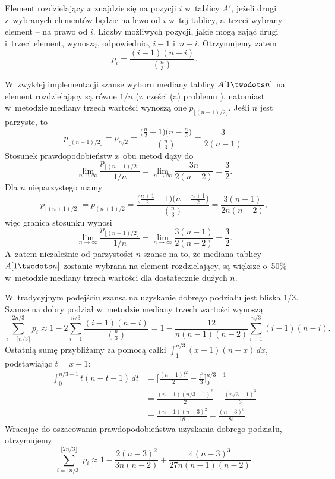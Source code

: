
\subproblem %
Element rozdzielający $x$ znajdzie się na pozycji $i$ w~tablicy $A'$, jeżeli drugi z~wybranych elementów będzie na lewo od $i$ w~tej tablicy, a~trzeci wybrany element -- na prawo od $i$.
Liczby możliwych pozycji, jakie mogą zająć drugi i~trzeci element, wynoszą, odpowiednio, $i-1$ i~$n-i$.
Otrzymujemy zatem
\[
	p_i = \frac{(i-1)(n-i)}{\binom{n}{3}}.
\]

\subproblem %
W~zwykłej implementacji szanse wyboru mediany tablicy $A[1\twodots n]$ na element rozdzielający są równe $1/n$ (z~części (a) problemu ), natomiast w~metodzie mediany trzech wartości wynoszą one $p_{\lfloor(n+1)/2\rfloor}$.
Jeśli $n$ jest parzyste, to
\[
	p_{\lfloor(n+1)/2\rfloor} = p_{n/2} = \frac{\bigl(\frac{n}{2}-1\bigr)\bigl(n-\frac{n}{2}\bigr)}{\binom{n}{3}} = \frac{3}{2(n-1)}.
\]
Stosunek prawdopodobieństw z~obu metod dąży do
\[
    \lim_{n\to\infty}\frac{p_{\lfloor(n+1)/2\rfloor}}{1/n} = \lim_{n\to\infty}\frac{3n}{2(n-2)} = \frac{3}{2}.
\]
Dla $n$ nieparzystego mamy
\[
	p_{\lfloor(n+1)/2\rfloor} = p_{(n+1)/2} = \frac{\bigl(\frac{n+1}{2}-1\bigr)\bigl(n-\frac{n+1}{2}\bigr)}{\binom{n}{3}} = \frac{3(n-1)}{2n(n-2)},
\]
więc granica stosunku wynosi
\[
    \lim_{n\to\infty}\frac{p_{\lfloor(n+1)/2\rfloor}}{1/n} = \lim_{n\to\infty}\frac{3(n-1)}{2(n-2)} = \frac{3}{2}.
\]
A~zatem niezależnie od parzystości $n$ szanse na to, że mediana tablicy $A[1\twodots n]$ zostanie wybrana na element rozdzielający, są większe o~50\% w~metodzie mediany trzech wartości dla dostatecznie dużych $n$.

\subproblem %
W~tradycyjnym podejściu szansa na uzyskanie dobrego podziału jest bliska $1/3$.
Szanse na dobry podział w~metodzie mediany trzech wartości wynoszą
\[
	\sum_{i=\lceil n/3\rceil}^{\lfloor 2n/3\rfloor}p_i \approx 1-2\sum_{i=1}^{n/3}\frac{(i-1)(n-i)}{\binom{n}{3}} = 1-\frac{12}{n(n-1)(n-2)}\sum_{i=1}^{n/3}(i-1)(n-i).
\]
Ostatnią sumę przybliżamy za pomocą całki $\int_1^{n/3}(x-1)(n-x)\,dx$, podstawiając $t=x-1$:
\begin{align*}
    \int_0^{n/3-1}t(n-t-1)\,dt &= \biggl[\frac{(n-1)t^2}{2}-\frac{t^3}{3}\biggr]_0^{n/3-1} \\[1mm]
	&= \frac{(n-1)(n/3-1)^2}{2}-\frac{(n/3-1)^3}{3} \\[1mm]
	&= \frac{(n-1)(n-3)^2}{18}-\frac{(n-3)^3}{81}.
\end{align*}
Wracając do oszacowania prawdopodobieństwa uzyskania dobrego podziału, otrzymujemy
\[
    \sum_{i=\lceil n/3\rceil}^{\lfloor 2n/3\rfloor}p_i \approx 1-\frac{2(n-3)^2}{3n(n-2)}+\frac{4(n-3)^3}{27n(n-1)(n-2)}.
\]

